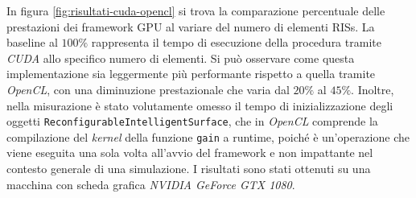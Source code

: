 In figura \ref{fig:risultati-cuda-opencl} si trova la comparazione percentuale
delle prestazioni dei framework GPU al variare del numero di elementi RISs. La baseline
al $100\%$ rappresenta il tempo di esecuzione della procedura tramite \textit{CUDA}
allo specifico numero di elementi. Si può osservare come questa implementazione sia
leggermente più performante rispetto a quella tramite \textit{OpenCL}, con una diminuzione
prestazionale che varia dal $20\%$ al $45\%$. Inoltre, nella misurazione è stato
volutamente omesso il tempo di inizializzazione degli oggetti \texttt{ReconfigurableIntelligentSurface},
che in \textit{OpenCL} comprende la compilazione del \textit{kernel} della funzione
\texttt{gain} a runtime, poiché è un'operazione che viene eseguita una sola volta
all'avvio del framework e non impattante nel contesto generale di una simulazione.
I risultati sono stati ottenuti su una macchina con scheda grafica \textit{NVIDIA
GeForce GTX 1080}.

